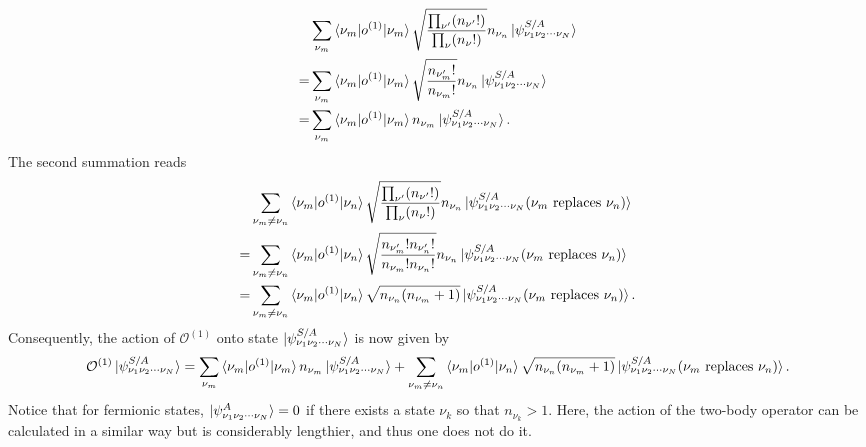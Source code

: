 \documentclass[a4paper,12pts]{article}
\numberwithin{equation}{section}
\begin{document}
	\begin{align}
	&\sum_{\nu_m}\braket{\nu_m|o^{(1)}|\nu_m}\sqrt{\frac{\prod_{\nu'}(n_{\nu'}!)}{\prod_{\nu}(n_{\nu}!)}}n_{\nu_n}\ket{\psi_{\nu_1\nu_2\cdots\nu_N}^{S/A}}\nonumber\\
	=& \sum_{\nu_m}\braket{\nu_m|o^{(1)}|\nu_m}\sqrt{\frac{n_{\nu_m'}!}{n_{\nu_m}!}}n_{\nu_n}\ket{\psi_{\nu_1\nu_2\cdots\nu_N}^{S/A}}\\
	=& \sum_{\nu_m}\braket{\nu_m|o^{(1)}|\nu_m}n_{\nu_m}\ket{\psi_{\nu_1\nu_2\cdots\nu_N}^{S/A}}.
	\end{align}
	The second summation reads
	\begin{align}
	&\sum_{\nu_m\neq
		\nu_n}\braket{\nu_m|o^{(1)}|\nu_n}\sqrt{\frac{\prod_{\nu'}(n_{\nu'}!)}{\prod_{\nu}(n_{\nu}!)}}n_{\nu_n}\ket{\psi_{\nu_1\nu_2\cdots\nu_N}^{S/A}(\nu_m\text{ replaces }\nu_n)}\nonumber\\
	=& \sum_{\nu_m\neq\nu_n}\braket{\nu_m|o^{(1)}|\nu_n}\sqrt{\frac{n_{\nu_m'}!n_{\nu_n'}!}{n_{\nu_m}!n_{\nu_n}!}}n_{\nu_n}\ket{\psi_{\nu_1\nu_2\cdots\nu_N}^{S/A}(\nu_m\text{ replaces }\nu_n)}\nonumber\\
	=& \sum_{\nu_m\neq\nu_n}\braket{\nu_m|o^{(1)}|\nu_n}\sqrt{n_{\nu_n}(n_{\nu_m}+1)}\ket{\psi_{\nu_1\nu_2\cdots\nu_N}^{S/A}(\nu_m\text{ replaces }\nu_n)}.
	\end{align}
	Consequently, the action of $\mathcal{O}^{(1)}$ onto state $\ket{\psi_{\nu_1\nu_2\cdots\nu_N}^{S/A}}$ is now given by
	\begin{align}
	\mathcal{O}^{(1)}\ket{\psi_{\nu_1\nu_2\cdots\nu_N}^{S/A}} = \sum_{\nu_m}\braket{\nu_m|o^{(1)}|\nu_m}n_{\nu_m}\ket{\psi_{\nu_1\nu_2\cdots\nu_N}^{S/A}} + \sum_{\nu_m\neq\nu_n}\braket{\nu_m|o^{(1)}|\nu_n}\sqrt{n_{\nu_n}(n_{\nu_m}+1)}\ket{\psi_{\nu_1\nu_2\cdots\nu_N}^{S/A}(\nu_m\text{ replaces }\nu_n)}.\label{eq:action}
	\end{align}
	Notice that for fermionic states, $\ket{\psi_{\nu_1\nu_2\cdots\nu_N}^{A}}=0$ if there exists a state $\nu_k$ so that $n_{\nu_k}>1$. Here, the action of the two-body operator can be calculated in a similar way but is considerably lengthier, and thus one does not do it.
\end{document}
